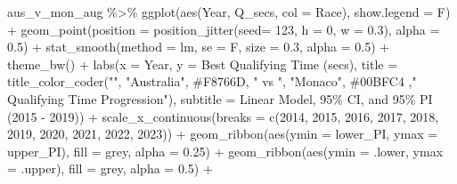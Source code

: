 \documentclass[
]{book}
\newenvironment{Shaded}{\begin{snugshade}}{\end{snugshade}}
\newcommand{\AttributeTok}[1]{\textcolor[rgb]{0.77,0.63,0.00}{#1}}
\newcommand{\DecValTok}[1]{\textcolor[rgb]{0.00,0.00,0.81}{#1}}
\newcommand{\FloatTok}[1]{\textcolor[rgb]{0.00,0.00,0.81}{#1}}
\newcommand{\FunctionTok}[1]{\textcolor[rgb]{0.00,0.00,0.00}{#1}}
\newcommand{\NormalTok}[1]{#1}
\newcommand{\SpecialCharTok}[1]{\textcolor[rgb]{0.00,0.00,0.00}{#1}}
\newcommand{\StringTok}[1]{\textcolor[rgb]{0.31,0.60,0.02}{#1}}
\begin{document}
\begin{Shaded}
\begin{Highlighting}[]
\NormalTok{aus\_v\_mon\_aug }\SpecialCharTok{\%\textgreater{}\%} 
  \FunctionTok{ggplot}\NormalTok{(}\FunctionTok{aes}\NormalTok{(Year, Q\_secs, }\AttributeTok{col =}\NormalTok{ Race), }\AttributeTok{show.legend =}\NormalTok{ F) }\SpecialCharTok{+}
  \FunctionTok{geom\_point}\NormalTok{(}\AttributeTok{position =} \FunctionTok{position\_jitter}\NormalTok{(}\AttributeTok{seed=} \DecValTok{123}\NormalTok{, }\AttributeTok{h =} \DecValTok{0}\NormalTok{, }\AttributeTok{w =} \FloatTok{0.3}\NormalTok{), }\AttributeTok{alpha =} \FloatTok{0.5}\NormalTok{) }\SpecialCharTok{+}
  \FunctionTok{stat\_smooth}\NormalTok{(}\AttributeTok{method =} \StringTok{\textquotesingle{}lm\textquotesingle{}}\NormalTok{, }\AttributeTok{se =}\NormalTok{ F, }\AttributeTok{size =} \FloatTok{0.3}\NormalTok{, }\AttributeTok{alpha =} \FloatTok{0.5}\NormalTok{) }\SpecialCharTok{+} 
  \FunctionTok{theme\_bw}\NormalTok{() }\SpecialCharTok{+}
  \FunctionTok{labs}\NormalTok{(}\AttributeTok{x =} \StringTok{\textquotesingle{}Year\textquotesingle{}}\NormalTok{,}
       \AttributeTok{y =} \StringTok{\textquotesingle{}Best Qualifying Time (secs)\textquotesingle{}}\NormalTok{,}
       \AttributeTok{title =} \FunctionTok{title\_color\_coder}\NormalTok{(}\StringTok{""}\NormalTok{, }\StringTok{"Australia"}\NormalTok{, }\StringTok{\textquotesingle{}\#F8766D\textquotesingle{}}\NormalTok{, }\StringTok{" vs "}\NormalTok{, }\StringTok{"Monaco"}\NormalTok{, }\StringTok{\textquotesingle{}\#00BFC4\textquotesingle{}}\NormalTok{ ,}\StringTok{" Qualifying Time Progression"}\NormalTok{),}
       \AttributeTok{subtitle =} \StringTok{\textquotesingle{}Linear Model, 95\% CI, and 95\% PI (2015 {-} 2019)\textquotesingle{}}\NormalTok{) }\SpecialCharTok{+}
  \FunctionTok{scale\_x\_continuous}\NormalTok{(}\AttributeTok{breaks =} \FunctionTok{c}\NormalTok{(}\DecValTok{2014}\NormalTok{, }\DecValTok{2015}\NormalTok{, }\DecValTok{2016}\NormalTok{, }\DecValTok{2017}\NormalTok{, }\DecValTok{2018}\NormalTok{, }\DecValTok{2019}\NormalTok{, }\DecValTok{2020}\NormalTok{, }\DecValTok{2021}\NormalTok{, }\DecValTok{2022}\NormalTok{, }\DecValTok{2023}\NormalTok{)) }\SpecialCharTok{+}
  \FunctionTok{geom\_ribbon}\NormalTok{(}\FunctionTok{aes}\NormalTok{(}\AttributeTok{ymin =}\NormalTok{ lower\_PI, }\AttributeTok{ymax =}\NormalTok{ upper\_PI), }\AttributeTok{fill =} \StringTok{\textquotesingle{}grey\textquotesingle{}}\NormalTok{, }\AttributeTok{alpha =} \FloatTok{0.25}\NormalTok{) }\SpecialCharTok{+}
  \FunctionTok{geom\_ribbon}\NormalTok{(}\FunctionTok{aes}\NormalTok{(}\AttributeTok{ymin =}\NormalTok{ .lower, }\AttributeTok{ymax =}\NormalTok{ .upper), }\AttributeTok{fill =} \StringTok{\textquotesingle{}grey\textquotesingle{}}\NormalTok{, }\AttributeTok{alpha =} \FloatTok{0.5}\NormalTok{) }\SpecialCharTok{+} 

\end{Highlighting}
\end{Shaded}
\end{document}
